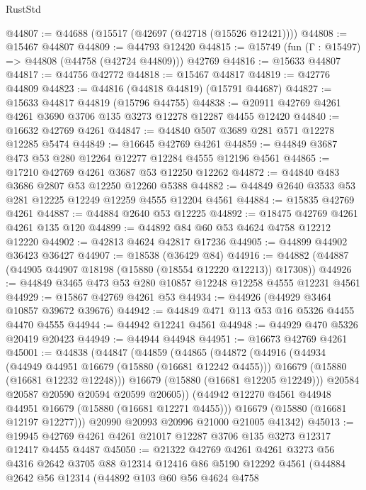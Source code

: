 \begin{lexlean}{RustStd}
\begin{coremodule}
@44807 := @44688 (@15517 (@42697 (@42718 (@15526 @12421))))
@44808 := @15467 @44807
@44809 := @44793 @12420
@44815 := @15749 (fun (Γ : @15497) => @44808 (@44758 (@42724 @44809))) @42769
@44816 := @15633 @44807
@44817 := @44756 @42772
@44818 := @15467 @44817
@44819 := @42776 @44809
@44823 := @44816 (@44818 @44819) (@15791 @44687)
@44827 := @15633 @44817 @44819 (@15796 @44755)
@44838 := @20911 @42769 @4261 @4261 @3690 @3706 @135 @3273 @12278 @12287 @4455 @12420
@44840 := @16632 @42769 @4261
@44847 := @44840 @507 @3689 @281 @571 @12278 @12285 @5474
@44849 := @16645 @42769 @4261
@44859 := @44849 @3687 @473 @53 @280 @12264 @12277 @12284 @4555 @12196 @4561
@44865 := @17210 @42769 @4261 @3687 @53 @12250 @12262
@44872 := @44840 @483 @3686 @2807 @53 @12250 @12260 @5388
@44882 := @44849 @2640 @3533 @53 @281 @12225 @12249 @12259 @4555 @12204 @4561
@44884 := @15835 @42769 @4261
@44887 := @44884 @2640 @53 @12225
@44892 := @18475 @42769 @4261 @4261 @135 @120
@44899 := @44892 @84 @60 @53 @4624 @4758 @12212 @12220
@44902 := @42813 @4624 @42817 @17236
@44905 := @44899 @44902 @36423 @36427
@44907 := @18538 (@36429 @84)
@44916 := @44882 (@44887 (@44905 @44907 @18198 (@15880 (@18554 @12220 @12213)) @17308))
@44926 := @44849 @3465 @473 @53 @280 @10857 @12248 @12258 @4555 @12231 @4561
@44929 := @15867 @42769 @4261 @53
@44934 := @44926 (@44929 @3464 @10857 @39672 @39676)
@44942 := @44849 @471 @113 @53 @16 @5326 @4455 @4470 @4555
@44944 := @44942 @12241 @4561
@44948 := @44929 @470 @5326 @20419 @20423
@44949 := @44944 @44948
@44951 := @16673 @42769 @4261
@45001 := @44838
    (@44847
      (@44859
        (@44865
          (@44872
            (@44916
              (@44934
                (@44949 @44951 @16679 (@15880 (@16681 @12242 @4455)))
                @16679
                (@15880 (@16681 @12232 @12248)))
              @16679
              (@15880 (@16681 @12205 @12249)))
            @20584
            @20587
            @20590
            @20594
            @20599
            @20605))
        (@44942 @12270 @4561 @44948 @44951 @16679 (@15880 (@16681 @12271 @4455)))
        @16679
        (@15880 (@16681 @12197 @12277)))
      @20990
      @20993
      @20996
      @21000
      @21005
      @41342)
@45013 := @19945 @42769 @4261 @4261 @21017 @12287 @3706 @135 @3273 @12317 @12417 @4455 @4487
@45050 := @21322
    @42769
    @4261
    @4261
    @3273
    @56
    @4316
    @2642
    @3705
    @88
    @12314
    @12416
    @86
    @5190
    @12292
    @4561
    (@44884
      @2642
      @56
      @12314
      (@44892
        @103
        @60
        @56
        @4624
        @4758

\end{coremodule}
\end{lexlean}
